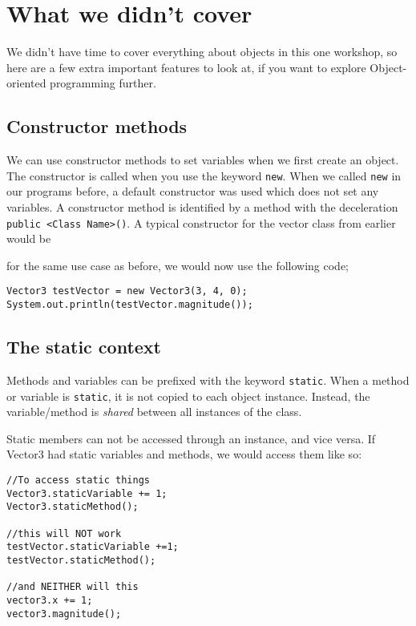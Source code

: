 \section{What we didn't cover}

	We didn't have time to cover everything about objects in this one workshop, so here are a few extra important features to look at, if you want to explore Object-oriented programming further.
	
	\subsection*{Constructor methods}
	
		We can use constructor methods to set variables when we first create an object.
		\ifprint\else The constructor is called when you use the keyword \texttt{new}. When we called \texttt{new} in our programs before, a default constructor was used which does not set any variables.\fi		
		A constructor method is identified by a method with the deceleration \texttt{public <Class Name>()}. A typical constructor for the vector class from earlier would be
		
		
		
		for the same use case as before, we would now use the following code;
		
		\begin{lstlisting}[style=Java, numbers=none]
Vector3 testVector = new Vector3(3, 4, 0);
System.out.println(testVector.magnitude());
		\end{lstlisting}
		
	\subsection*{The static context}
	
		Methods and variables can be prefixed with the keyword \texttt{static}. When a method or variable is \texttt{static}, it is not copied to each object instance. Instead, the variable/method is \textit{shared} between all instances of the class. 
		
		Static members can not be accessed through an instance, and vice versa. If Vector3 had static variables and methods, we would access them like so:
		
		\begin{lstlisting}[style=Java, numbers=none]
//To access static things
Vector3.staticVariable += 1;
Vector3.staticMethod();

//this will NOT work
testVector.staticVariable +=1;
testVector.staticMethod();

//and NEITHER will this
vector3.x += 1;
vector3.magnitude();
		\end{lstlisting}
		
